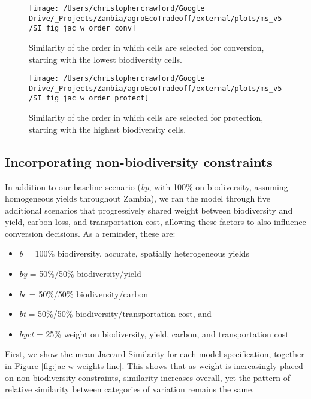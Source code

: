 \documentclass[
]{article}
\providecommand{\tightlist}{%
  \setlength{\itemsep}{0pt}\setlength{\parskip}{0pt}}
\begin{document}
\begin{figure}
\texttt{[image: /Users/christophercrawford/Google Drive/\_Projects/Zambia/agroEcoTradeoff/external/plots/ms\_v5/SI\_fig\_jac\_w\_order\_conv]} \caption{Similarity of the order in which cells are selected for conversion, starting with the lowest biodiversity cells.}\label{fig:order-conv}
\end{figure}

\begin{figure}
\texttt{[image: /Users/christophercrawford/Google Drive/\_Projects/Zambia/agroEcoTradeoff/external/plots/ms\_v5/SI\_fig\_jac\_w\_order\_protect]} \caption{Similarity of the order in which cells are selected for protection, starting with the highest biodiversity cells.}\label{fig:order-protect}
\end{figure}

\newpage

\hypertarget{weights-results}{%
\subsection{Incorporating non-biodiversity constraints}\label{weights-results}}

In addition to our baseline scenario (\emph{bp}, with 100\% on biodiversity, assuming homogeneous yields throughout Zambia), we ran the model through five additional scenarios that progressively shared weight between biodiversity and yield, carbon loss, and transportation cost, allowing these factors to also influence conversion decisions. As a reminder, these are:

\begin{itemize}
\tightlist
\item
  \emph{b} = 100\% biodiversity, accurate, spatially heterogeneous yields
\item
  \emph{by} = 50\%/50\% biodiversity/yield
\item
  \emph{bc} = 50\%/50\% biodiversity/carbon
\item
  \emph{bt} = 50\%/50\% biodiversity/transportation cost, and
\item
  \emph{byct} = 25\% weight on biodiversity, yield, carbon, and transportation cost
\end{itemize}

First, we show the mean Jaccard Similarity for each model specification, together in Figure \ref{fig:jac-w-weights-line}. This shows that as weight is increasingly placed on non-biodiversity constraints, similarity increases overall, yet the pattern of relative similarity between categories of variation remains the same.
\end{document}
